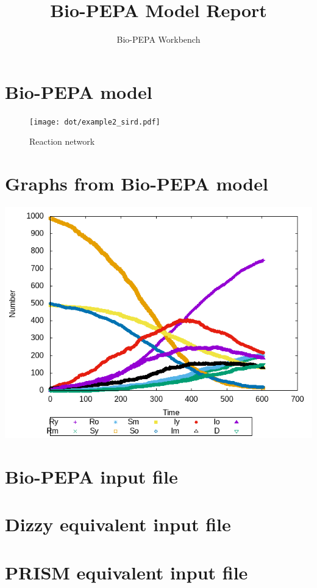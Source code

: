 \documentclass{llncs}
\title{Bio-PEPA Model Report}
\author{Bio-PEPA Workbench}
\institute{\today}
\begin{document}
\maketitle
\section{Bio-PEPA model}

\begin{figure}[htbp]
\begin{center}
\texttt{[image: dot/example2\_sird.pdf]}
\caption{Reaction network}
\end{center}
\end{figure}
\newpage
\section{Graphs from Bio-PEPA model}
\includegraphics[scale=1]{png/example2_sird001_stochkit_results_0}
\appendix
\newpage
\section{Bio-PEPA input file}

\newpage
\section{Dizzy equivalent input file}

\newpage
\section{PRISM equivalent input file}

\end{document}
